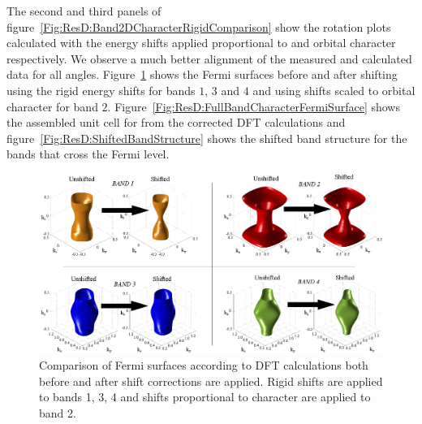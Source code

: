 The second and third panels of figure~\ref{Fig:ResD:Band2DCharacterRigidComparison} show the rotation plots calculated with the energy shifts applied proportional to \DzTwo and \DxzDyz orbital character respectively. We observe a much better alignment of the measured and calculated data for all angles. Figure~\ref{Fig:ResD:BandCharacterFSShiftComparison} shows the Fermi surfaces before and after shifting using the rigid energy shifts for bands $1$, $3$ and $4$ and using shifts scaled to \DzTwo orbital character for band $2$. Figure~\ref{Fig:ResD:FullBandCharacterFermiSurface} shows the assembled unit cell for \BaFeP from the corrected \ac{DFT} calculations and figure~\ref{Fig:ResD:ShiftedBandStructure} shows the shifted band structure for the bands that cross the Fermi level.
\begin{figure}[htbp]
    \begin{center}
        \includegraphics[scale=0.8]{Chapter-dHvABaFe2P2/Figures/AngleDepMeasurements/BandCharacterFermiSurface/BandCharacterFermiSurfaceShiftComparison}
        \caption{Comparison of Fermi surfaces according to \ac{DFT} calculations both before and after shift corrections are applied. Rigid shifts are applied to bands 1, 3, 4 and shifts proportional to \DzTwo character are applied to band 2.}
        \label{Fig:ResD:BandCharacterFSShiftComparison}
    \end{center}
\end{figure}
